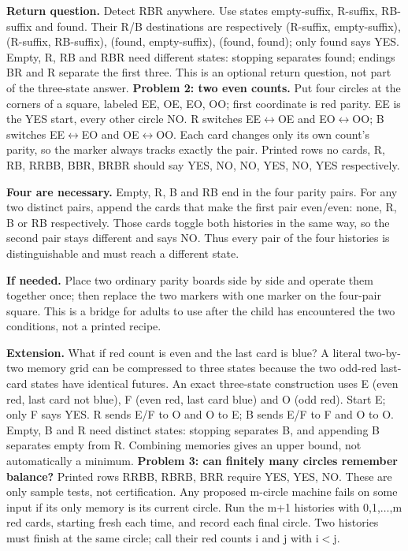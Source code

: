\documentclass[11pt]{article}
\begin{document}
\textbf{Return question.} Detect RBR anywhere. Use states empty-suffix, R-suffix, RB-suffix and found. Their R/B destinations are respectively (R-suffix, empty-suffix), (R-suffix, RB-suffix), (found, empty-suffix), (found, found); only found says YES. Empty, R, RB and RBR need different states: stopping separates found; endings BR and R separate the first three. This is an optional return question, not part of the three-state answer.
\newpage
\textbf{Problem 2: two even counts.} Put four circles at the corners of a square, labeled EE, OE, EO, OO; first coordinate is red parity. EE is the YES start, every other circle NO. R switches EE\(\leftrightarrow\)OE and EO\(\leftrightarrow\)OO; B switches EE\(\leftrightarrow\)EO and OE\(\leftrightarrow\)OO. Each card changes only its own count's parity, so the marker always tracks exactly the pair. Printed rows no cards, R, RB, RRBB, BBR, BRBR should say YES, NO, NO, YES, NO, YES respectively.

\textbf{Four are necessary.} Empty, R, B and RB end in the four parity pairs. For any two distinct pairs, append the cards that make the first pair even/even: none, R, B or RB respectively. Those cards toggle both histories in the same way, so the second pair stays different and says NO. Thus every pair of the four histories is distinguishable and must reach a different state.

\textbf{If needed.} Place two ordinary parity boards side by side and operate them together once; then replace the two markers with one marker on the four-pair square. This is a bridge for adults to use after the child has encountered the two conditions, not a printed recipe.

\textbf{Extension.} What if red count is even and the last card is blue? A literal two-by-two memory grid can be compressed to three states because the two odd-red last-card states have identical futures. An exact three-state construction uses E (even red, last card not blue), F (even red, last card blue) and O (odd red). Start E; only F says YES. R sends E/F to O and O to E; B sends E/F to F and O to O. Empty, B and R need distinct states: stopping separates B, and appending B separates empty from R. Combining memories gives an upper bound, not automatically a minimum.
\newpage
\textbf{Problem 3: can finitely many circles remember balance?} Printed rows RRBB, RBRB, BRR require YES, YES, NO. These are only sample tests, not certification. Any proposed m-circle machine fails on some input if its only memory is its current circle. Run the m+1 histories with 0,1,\(\ldots\),m red cards, starting fresh each time, and record each final circle. Two histories must finish at the same circle; call their red counts i and j with i\(<\)j.
\end{document}
